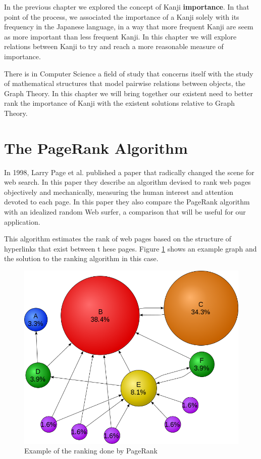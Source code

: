 In the previous chapter we explored the concept of Kanji \textbf{importance}. In that point of the process, we associated the importance of a Kanji solely with its frequency in the Japanese language, in a way that more frequent Kanji are seem as more important than less frequent Kanji. In this chapter we will explore relations between Kanji to try and reach a more reasonable measure of importance.

There is in Computer Science a field of study that concerns itself with the study of mathematical structures that model pairwise relations between objects, the Graph Theory. In this chapter we will bring together our existent need to better rank the importance of Kanji with the existent solutions relative to Graph Theory.

\section{The PageRank Algorithm}
In 1998, Larry Page et al. published a paper that radically changed the scene for web search\cite{page1999pagerank}. In this paper they describe an algorithm devised to rank web pages objectively and mechanically, measuring the human interest and attention devoted to each page. In this paper they also compare the PageRank algorithm with an idealized random Web surfer, a comparison that will be useful for our application.

This algorithm estimates the rank of web pages based on the structure of hyperlinks that exist between t
hese pages. Figure \ref{fig:pagerank} shows an example graph and the solution to the ranking algorithm in this case.

\begin{figure}[ht]
    \centering
    \includegraphics[width=0.75\linewidth]{Cap4/PageRankExample}
    \caption{Example of the ranking done by PageRank}
    \label{fig:pagerank}
\end{figure}

